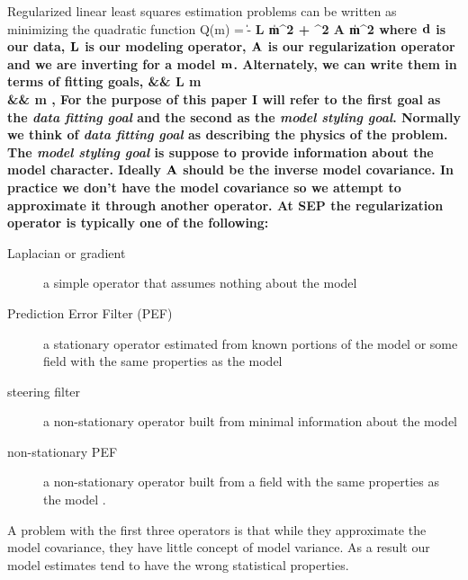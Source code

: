 Regularized linear least squares estimation
problems can be written as minimizing the quadratic
function
\beq
Q(m) = \|\data- \bf L \bf m\|^2 + \epsilon^2 \|\bf A \bf m\|^2
\eeq
where $\bf d$ is our data, $\bf L$ is our modeling operator,
$\bf A$ is our regularization operator and we are inverting
for  a model $\bf m$.
Alternately, we can write  them
in terms of  fitting goals,
\beqa
\data &\approx& \bf L \bf m 
\label{eq:geophysics} \\
\nonumber
\zero &\approx& \epsilon  \reg \bf m 
,
\eeqa
For the purpose of this paper I will refer to the first
goal as the {\it data fitting goal} and the second as
the {\it model styling goal}.
Normally we think of {\it data fitting goal } as describing
the physics of the problem.  The {\it model styling goal} is suppose
to provide information about the model character.  Ideally 
$\bf A$ should be the inverse model covariance.   In practice
we don't have the model covariance so we attempt  to approximate it through
another operator.   At SEP the regularization operator is  typically one
of the following:
\begin{description}
\item [Laplacian or gradient]  a simple operator that assumes nothing about the model
\item [Prediction Error Filter (PEF)]  a stationary operator  estimated from known portions of the model or  some field with the same properties as the model \cite{gee}
\item [steering filter] a non-stationary operator built from minimal information about the model \cite{Clapp.sep.95.bob1}
\item [non-stationary PEF] a non-stationary operator built from a field with the same properties as the model \cite{Crawley.sep.104}.
\end{description}
A problem with the first three operators is
that while they approximate the model covariance, they
have little concept of model variance.  As a result our model estimates  tend
to have the wrong statistical properties.

